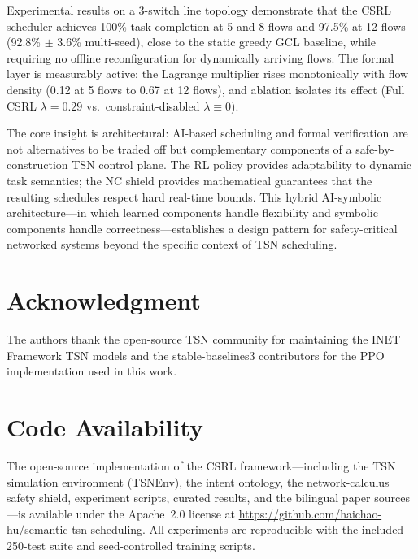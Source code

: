 \documentclass[conference]{IEEEtran}
\begin{document}
Experimental results on a 3-switch line topology demonstrate that the CSRL scheduler achieves 100\% task completion at 5 and 8 flows and 97.5\% at 12 flows (92.8\% $\pm$ 3.6\% multi-seed), close to the static greedy GCL baseline, while requiring no offline reconfiguration for dynamically arriving flows. The formal layer is measurably active: the Lagrange multiplier rises monotonically with flow density (0.12 at 5 flows to 0.67 at 12 flows), and ablation isolates its effect (Full CSRL $\lambda=0.29$ vs.\ constraint-disabled $\lambda\equiv0$).

The core insight is architectural: AI-based scheduling and formal verification are not alternatives to be traded off but complementary components of a safe-by-construction TSN control plane. The RL policy provides adaptability to dynamic task semantics; the NC shield provides mathematical guarantees that the resulting schedules respect hard real-time bounds. This hybrid AI-symbolic architecture---in which learned components handle flexibility and symbolic components handle correctness---establishes a design pattern for safety-critical networked systems beyond the specific context of TSN scheduling.

\section*{Acknowledgment}

The authors thank the open-source TSN community for maintaining the INET Framework TSN models and the stable-baselines3 contributors for the PPO implementation used in this work.

\section*{Code Availability}

The open-source implementation of the CSRL framework---including the TSN simulation environment (TSNEnv), the intent ontology, the network-calculus safety shield, experiment scripts, curated results, and the bilingual paper sources---is available under the Apache~2.0 license at \url{https://github.com/haichao-hu/semantic-tsn-scheduling}. All experiments are reproducible with the included 250-test suite and seed-controlled training scripts.
\end{document}
